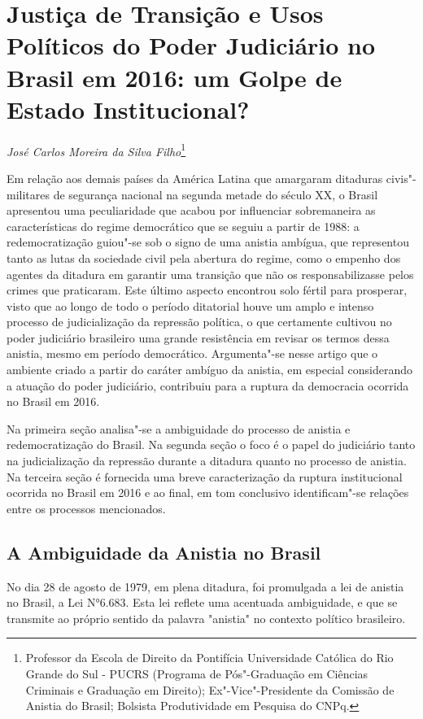 \chapter{Justiça de Transição e Usos Políticos do Poder Judiciário no
Brasil em 2016: um Golpe de Estado Institucional?}

\emph{José Carlos Moreira da Silva Filho}\footnote{Professor da Escola
  de Direito da Pontifícia Universidade Católica do Rio Grande do Sul -
  PUCRS (Programa de Pós"-Graduação em Ciências Criminais e Graduação em
  Direito); Ex"-Vice"-Presidente da Comissão de Anistia do Brasil;
  Bolsista Produtividade em Pesquisa do CNPq.}

Em relação aos demais países da América Latina que amargaram ditaduras
civis"-militares de segurança nacional na segunda metade do século XX, o
Brasil apresentou uma peculiaridade que acabou por influenciar
sobremaneira as características do regime democrático que se seguiu a
partir de 1988: a redemocratização guiou"-se sob o signo de uma anistia
ambígua, que representou tanto as lutas da sociedade civil pela abertura
do regime, como o empenho dos agentes da ditadura em garantir uma
transição que não os responsabilizasse pelos crimes que praticaram. Este
último aspecto encontrou solo fértil para prosperar, visto que ao longo
de todo o período ditatorial houve um amplo e intenso processo de
judicialização da repressão política, o que certamente cultivou no poder
judiciário brasileiro uma grande resistência em revisar os termos dessa
anistia, mesmo em período democrático. Argumenta"-se nesse artigo que o
ambiente criado a partir do caráter ambíguo da anistia, em especial
considerando a atuação do poder judiciário, contribuiu para a ruptura da
democracia ocorrida no Brasil em 2016.

Na primeira seção analisa"-se a ambiguidade do processo de anistia e
redemocratização do Brasil. Na segunda seção o foco é o papel do
judiciário tanto na judicialização da repressão durante a ditadura
quanto no processo de anistia. Na terceira seção é fornecida uma breve
caracterização da ruptura institucional ocorrida no Brasil em 2016 e ao
final, em tom conclusivo identificam"-se relações entre os processos
mencionados.

\section{A Ambiguidade da Anistia no Brasil}

No dia 28 de agosto de 1979, em plena ditadura, foi promulgada a lei de
anistia no Brasil, a Lei N°6.683. Esta lei reflete uma acentuada
ambiguidade, e que se transmite ao próprio sentido da palavra "anistia"
no contexto político brasileiro.

